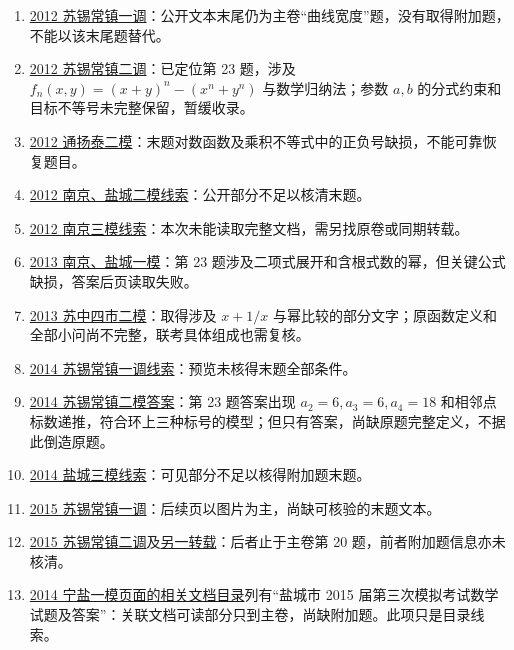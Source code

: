\documentclass[UTF8,12pt,a4paper,fontset=fandol]{ctexart}
\begin{document}
\begin{enumerate}
\item \href{https://www.1mpi.com/doc/9074c29f2b110b8bb634e626}{2012 苏锡常镇一调}：公开文本末尾仍为主卷“曲线宽度”题，没有取得附加题，不能以该末尾题替代。
\item \href{https://www.mianfeiwendang.com/doc/fbfc7ec96dd36d63a7bf9e7d/5}{2012 苏锡常镇二调}：已定位第 23 题，涉及 $f_n(x,y)=(x+y)^n-(x^n+y^n)$ 与数学归纳法；参数 $a,b$ 的分式约束和目标不等号未完整保留，暂缓收录。
\item \href{https://doc.xuehai.net/b82f390d6798cd90b0ed7c51f.html}{2012 通扬泰二模}：末题对数函数及乘积不等式中的正负号缺损，不能可靠恢复题目。
\item \href{https://www.51wendang.com/doc/517100508630501f27d3bf9d}{2012 南京、盐城二模线索}：公开部分不足以核清末题。
\item \href{https://doc.xuehai.net/b5cafa3f91746899ae088795f.html}{2012 南京三模线索}：本次未能读取完整文档，需另找原卷或同期转载。
\item \href{https://www.51wendang.com/doc/30287572122302d8cbc36f9e/7}{2013 南京、盐城一模}：第 23 题涉及二项式展开和含根式数的幂，但关键公式缺损，答案后页读取失败。
\item \href{https://doc.xuehai.net/b9a2cc392ff2ad5ca2fdcb82f.html}{2013 苏中四市二模}：取得涉及 $x+1/x$ 与幂比较的部分文字；原函数定义和全部小问尚不完整，联考具体组成也需复核。
\item \href{https://max.book118.com/html/2017/0331/98180636.shtm}{2014 苏锡常镇一调线索}：预览未核得末题全部条件。
\item \href{https://doc.xuehai.net/bd211a532a3be38c0302b5df3-8.html}{2014 苏锡常镇二模答案}：第 23 题答案出现 $a_2=6,a_3=6,a_4=18$ 和相邻点标数递推，符合环上三种标号的模型；但只有答案，尚缺原题完整定义，不据此倒造原题。
\item \href{https://doc.xuehai.net/b11a07d49cb418f9a37ccf351.html}{2014 盐城三模线索}：可见部分不足以核得附加题末题。
\item \href{https://doc.xuehai.net/babe53a180f948f2c555dad51.html}{2015 苏锡常镇一调}：后续页以图片为主，尚缺可核验的末题文本。
\item \href{https://doc.xuehai.net/b9341d44caa5719f543ac937a.html}{2015 苏锡常镇二调}及\href{https://www.mianfeiwendang.com/doc/8ec448b5e1bc8af6e7874d05}{另一转载}：后者止于主卷第 20 题，前者附加题信息亦未核清。
\item \href{https://www.51wendang.com/doc/b354a966ae74314766a3ac38}{2014 宁盐一模页面的相关文档目录}列有“盐城市 2015 届第三次模拟考试数学试题及答案”：关联文档可读部分只到主卷，尚缺附加题。此项只是目录线索。

\end{enumerate}
\end{document}
